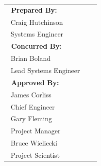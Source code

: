 \documentclass[12pt,oneside,oldfontcommands]{memoir}
\begin{document}
\begin{table}[htbp]
\begin{minipage}{\linewidth}
\centering
\small
\begin{tabulary}{\textwidth}{p{3.325in}p{0.225in}p{2.5in}}
\bfseries{~Prepared By:} & & \\[0.35in]
\cmidrule(l){1-1}%
~Craig Hutchinson\\
~Systems Engineer\\[0.25in]
\bfseries{~Concurred By:} & & \\[0.35in]
\cmidrule(l){1-1}%
~Brian Boland & &  \\
~Lead Systems Engineer & &  \\[0.35in]
\bfseries{~Approved By:} & & \\[0.35in]
\cmidrule(l){1-1}%
~James Corliss & &  \\
~Chief Engineer & &  \\[0.35in]
\cmidrule(l){1-1}%
~Gary Fleming & &  \\
~Project Manager & &  \\[0.35in]
\cmidrule(l){1-1}%
~Bruce Wieliecki & &  \\
~Project Scientist & &  \\[0.4in]
\end{tabulary}
\end{minipage}
\end{table}
\clearpage%
\end{document}
